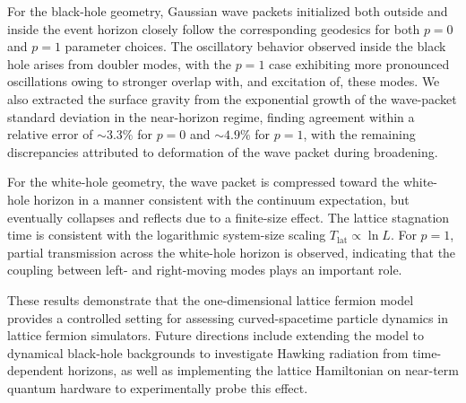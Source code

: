 \documentclass[reprint,amsmath,amssymb,aps,prb,floatfix,showkeys,superscriptaddress]{revtex4-2}
\begin{document}
For the black-hole geometry, Gaussian wave packets initialized both outside and inside the event horizon closely follow the corresponding geodesics for both $p=0$ and $p=1$ parameter choices. The oscillatory behavior observed inside the black hole arises from doubler modes, with the $p=1$ case exhibiting more pronounced oscillations owing to stronger overlap with, and excitation of, these modes. We also extracted the surface gravity from the exponential growth of the wave-packet standard deviation in the near-horizon regime, finding agreement within a relative error of $\sim 3.3\%$ for $p=0$ and $\sim 4.9\%$ for $p=1$, with the remaining discrepancies attributed to deformation of the wave packet during broadening.

For the white-hole geometry, the wave packet is compressed toward the white-hole horizon in a manner consistent with the continuum expectation, but eventually collapses and reflects due to a finite-size effect. The lattice stagnation time is consistent with the logarithmic system-size scaling $T_{\mathrm{lat}}\propto\ln L$. For $p=1$, partial transmission across the white-hole horizon is observed, indicating that the coupling between left- and right-moving modes plays an important role.

These results demonstrate that the one-dimensional lattice fermion model provides a controlled setting for assessing curved-spacetime particle dynamics in lattice fermion simulators. Future directions include extending the model to dynamical black-hole backgrounds to investigate Hawking radiation from time-dependent horizons, as well as implementing the lattice Hamiltonian on near-term quantum hardware to experimentally probe this effect.


\end{document}
